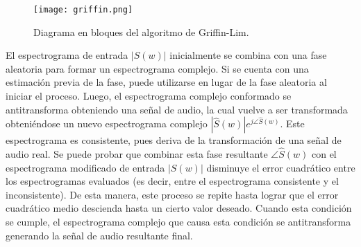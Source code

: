 \begin{figure}[H]
  \centering{}
  \texttt{[image: griffin.png]}
  \caption{Diagrama en bloques del algoritmo de Griffin-Lim.}
  \label{fig:griffin}
\end{figure}

El espectrograma de entrada $\left | S(w) \right |$ inicialmente se combina con una fase aleatoria para formar un espectrograma complejo. Si se cuenta con una estimación previa de la fase, puede utilizarse en lugar de la fase aleatoria al iniciar el proceso. Luego, el espectrograma complejo conformado se antitransforma obteniendo una señal de audio, la cual vuelve a ser transformada obteniéndose un nuevo espectrograma complejo $\left | \hat{S}(w) \right |e^{j\angle \hat{S}(w)}$. Este espectrograma es consistente, pues deriva de la transformación de una señal de audio real. Se puede probar que combinar esta fase resultante $\angle \hat{S}(w)$ con el espectrograma modificado de entrada $\left | S(w) \right |$ disminuye el error cuadrático entre los espectrogramas evaluados (es decir, entre el espectrograma consistente y el inconsistente). De esta manera, este proceso se repite hasta lograr que el error cuadrático medio descienda hasta un cierto valor deseado. Cuando esta condición se cumple, el espectrograma complejo que causa esta condición se antitransforma generando la señal de audio resultante final. 

